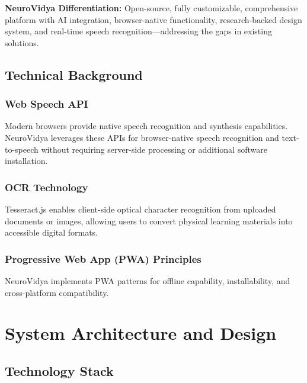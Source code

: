 \documentclass[journal]{IEEEtran}
\begin{document}
\textbf{NeuroVidya Differentiation:} Open-source, fully customizable, comprehensive platform with AI integration, browser-native functionality, research-backed design system, and real-time speech recognition—addressing the gaps in existing solutions.

\subsection{Technical Background}

\subsubsection{Web Speech API}
Modern browsers provide native speech recognition and synthesis capabilities. NeuroVidya leverages these APIs for browser-native speech recognition and text-to-speech without requiring server-side processing or additional software installation.

\subsubsection{OCR Technology}
Tesseract.js enables client-side optical character recognition from uploaded documents or images, allowing users to convert physical learning materials into accessible digital formats.

\subsubsection{Progressive Web App (PWA) Principles}
NeuroVidya implements PWA patterns for offline capability, installability, and cross-platform compatibility.

\section{System Architecture and Design}

\subsection{Technology Stack}
\end{document}
